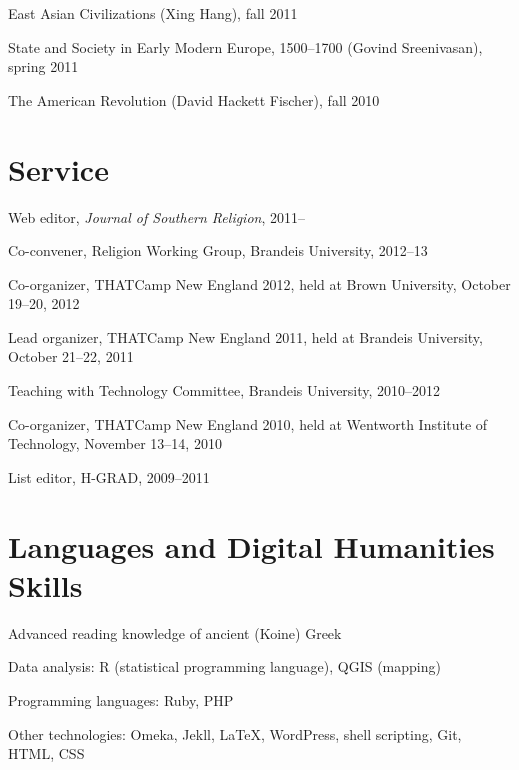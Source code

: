 \documentclass[11pt]{article}
\begin{document}
East Asian Civilizations (Xing Hang), fall 2011

State and Society in Early Modern Europe, 1500--1700
(Govind Sreenivasan), spring 2011

The American Revolution (David Hackett Fischer), fall 2010

\section{Service}

Web editor, \emph{Journal of Southern Religion}, 2011--

Co-convener, Religion Working Group, Brandeis University, 
2012--13

Co-organizer, THATCamp New England 2012, held at Brown University,
October 19--20, 2012

Lead organizer, THATCamp New England 2011, held at Brandeis University, 
October 21--22, 2011

Teaching with Technology Committee, Brandeis University, 2010--2012

Co-organizer, THATCamp New England 2010, held at Wentworth Institute of 
Technology, November 13--14, 2010

List editor, H-GRAD, 2009--2011




\section{Languages and Digital Humanities Skills}

Advanced reading knowledge of ancient (Koine) Greek

Data analysis: R (statistical programming language), QGIS (mapping)

Programming languages: Ruby, PHP

Other technologies: Omeka, Jekll, \LaTeX{}, \mbox{WordPress}, shell scripting, 
Git, HTML, CSS
\end{document}
